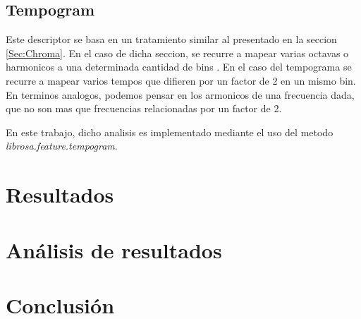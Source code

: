 \documentclass[]{article}
\begin{document}
\begin{multicols}{2}
\subsection{Tempogram}


Este descriptor se basa en un tratamiento similar al presentado en la seccion
\ref{Sec:Chroma}. En el caso de dicha seccion, se recurre a mapear varias octavas
o harmonicos a una determinada cantidad de bins \cite{kurth2006cyclic}. En el caso del tempograma se
recurre a mapear varios tempos que difieren por un factor de 2 en un mismo bin.
En terminos analogos, podemos pensar en los armonicos de una frecuencia dada,
que no son mas que frecuencias relacionadas por un factor de 2.

En este trabajo, dicho analisis es implementado mediante el uso del metodo \emph{{librosa.feature.tempogram}}.
\section{Resultados}





\section{Análisis de resultados}

\section{Conclusión}


\printbibliography
\end{multicols}
\end{document}
